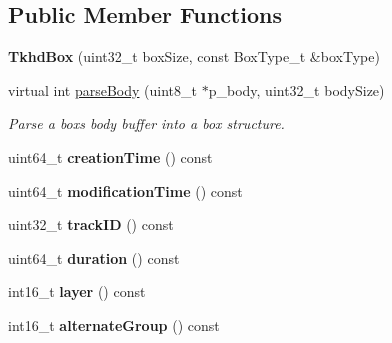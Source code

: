 \subsection*{Public Member Functions}
\begin{DoxyCompactItemize}
\item 
\mbox{\label{classmp4_parser_1_1_tkhd_box_a0f3ee140d6807af8002f9eebd3015c7f}} 
{\bfseries Tkhd\+Box} (uint32\+\_\+t box\+Size, const Box\+Type\+\_\+t \&box\+Type)
\item 
virtual int \mbox{\hyperlink{classmp4_parser_1_1_tkhd_box_ac70fee1e0bf78ef17d799a11be040b38}{parse\+Body}} (uint8\+\_\+t $\ast$p\+\_\+body, uint32\+\_\+t body\+Size)
\begin{DoxyCompactList}\small\item\em Parse a box\textquotesingle{}s body buffer into a box structure. \end{DoxyCompactList}\item 
\mbox{\label{classmp4_parser_1_1_tkhd_box_a98ce3d2d4ffec149b3fba849a89f8f71}} 
uint64\+\_\+t {\bfseries creation\+Time} () const
\item 
\mbox{\label{classmp4_parser_1_1_tkhd_box_a73712196155676cb843ad48e30c447f5}} 
uint64\+\_\+t {\bfseries modification\+Time} () const
\item 
\mbox{\label{classmp4_parser_1_1_tkhd_box_af34aa9f4374e6f4dea7615eefe8433d0}} 
uint32\+\_\+t {\bfseries track\+ID} () const
\item 
\mbox{\label{classmp4_parser_1_1_tkhd_box_ade15f48d0344ca734093acdf23dfe71d}} 
uint64\+\_\+t {\bfseries duration} () const
\item 
\mbox{\label{classmp4_parser_1_1_tkhd_box_ae2fe58b13e4fe5f040bde505758a9eaa}} 
int16\+\_\+t {\bfseries layer} () const
\item 
\mbox{\label{classmp4_parser_1_1_tkhd_box_a4d0f1a8c8b7c90e4c1417de9c7dce248}} 
int16\+\_\+t {\bfseries alternate\+Group} () const
\item 
\mbox{\label{classmp4_parser_1_1_tkhd_box_a39f7e74cb2fe270ef7c435ca8a64afdc}} 

\end{DoxyCompactItemize}
